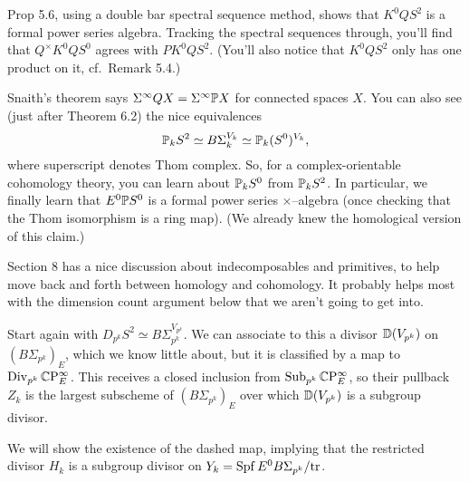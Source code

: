 Prop 5.6, using a double bar spectral sequence method, shows that $K^0 Q S^2$ is a formal power series algebra.  Tracking the spectral sequences through, you'll find that $Q^\times K^0 Q S^0$ agrees with $P K^0 Q S^2$.  (You'll also notice that $K^0 Q S^2$ only has one product on it, cf.\ Remark 5.4.)

Snaith's theorem says $\Sigma^\infty QX = \Sigma^\infty \P X$ for connected spaces $X$.  You can also see (just after Theorem 6.2) the nice equivalences \[\P_k S^2 \simeq B\Sigma_k^{V_k} \simeq \P_k(S^0)^{V_k},\] where superscript denotes Thom complex.  So, for a complex-orientable cohomology theory, you can learn about $\P_k S^0$ from $\P_k S^2$.  In particular, we finally learn that $E^0 \P S^0$ is a formal power series $\times$--algebra (once checking that the Thom isomorphism is a ring map).  (We already knew the homological version of this claim.)

Section 8 has a nice discussion about indecomposables and primitives, to help move back and forth between homology and cohomology.  It probably helps most with the dimension count argument below that we aren't going to get into.

Start again with $D_{p^k} S^2 \simeq B\Sigma_{p^k}^{V_{p^k}}$.  We can associate to this a divisor $\D(V_{p^k})$ on $(B\Sigma_{p^k})_E$, which we know little about, but it is classified by a map to $\Div_{p^k} \CP^\infty_E$.  This receives a closed inclusion from $\Sub_{p^k} \CP^\infty_E$, so their pullback $Z_k$ is the largest subscheme of $(B\Sigma_{p^k})_E$ over which $\D(V_{p^k})$ is a subgroup divisor.
\begin{center}
\end{center}
We will show the existence of the dashed map, implying that the restricted divisor $H_k$ is a subgroup divisor on $Y_k = \Spf E^0 B\Sigma_{p^k} / \mathrm{tr}$.

